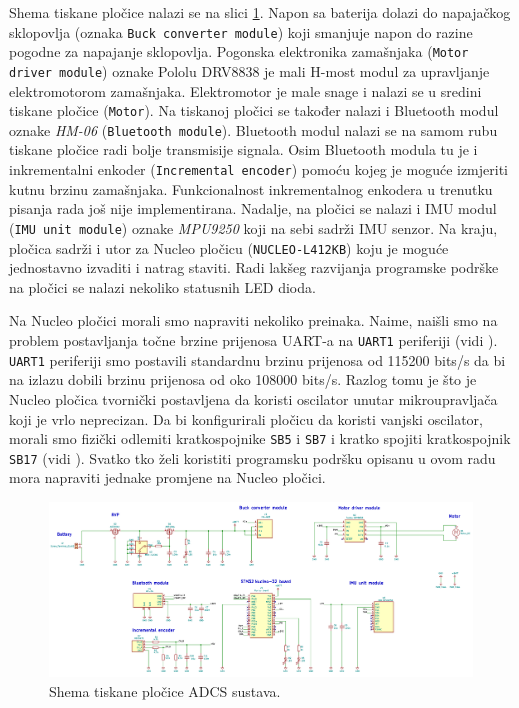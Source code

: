 \documentclass[times, utf8, diplomski, numeric]{templates/template}
\begin{document}
{{{            Shema tiskane pločice nalazi se na slici \ref{fig:plocica_shema}. Napon sa baterija dolazi do napajačkog sklopovlja (oznaka \texttt{Buck converter module}) koji smanjuje napon do razine pogodne za napajanje sklopovlja. Pogonska elektronika zamašnjaka (\texttt{Motor driver module}) oznake Pololu DRV8838 \cite{pololu} je mali H-most modul za upravljanje elektromotorom zamašnjaka. Elektromotor je male snage i nalazi se u sredini tiskane pločice (\texttt{Motor}). Na tiskanoj pločici se također nalazi i Bluetooth modul oznake \emph{HM-06} (\texttt{Bluetooth module}). Bluetooth modul nalazi se na samom rubu tiskane pločice radi bolje transmisije signala. Osim Bluetooth modula tu je i inkrementalni enkoder (\texttt{Incremental encoder}) pomoću kojeg je moguće izmjeriti kutnu brzinu zamašnjaka. Funkcionalnost inkrementalnog enkodera u trenutku pisanja rada još nije implementirana. Nadalje, na pločici se nalazi i IMU modul (\texttt{IMU unit module}) oznake \emph{MPU9250} koji na sebi sadrži IMU  senzor. Na kraju, pločica sadrži i utor za Nucleo pločicu (\texttt{NUCLEO-L412KB}) \cite{nucleo_um} koju je moguće jednostavno izvaditi i natrag staviti. Radi lakšeg razvijanja programske podrške na pločici se nalazi nekoliko statusnih LED dioda.

            Na Nucleo pločici morali smo napraviti nekoliko preinaka. Naime, naišli smo na problem postavljanja točne brzine prijenosa UART-a  na \texttt{UART1} periferiji (vidi \cite{uc_um}). \texttt{UART1} periferiji smo postavili standardnu brzinu prijenosa od 115200 bits/s da bi na izlazu dobili brzinu prijenosa od oko 108000 bits/s. Razlog tomu je što je Nucleo pločica tvornički postavljena da koristi oscilator unutar mikroupravljača koji je vrlo neprecizan. Da bi konfigurirali pločicu da koristi vanjski oscilator, morali smo fizički odlemiti kratkospojnike \texttt{SB5} i \texttt{SB7} i kratko spojiti kratkospojnik \texttt{SB17} (vidi \cite{nucleo_um}). Svatko tko želi koristiti programsku podršku opisanu u ovom radu mora napraviti jednake promjene na Nucleo pločici.

            \begin{figure}[htb]
            \centering
            \includegraphics[width=1.0\textwidth]{images/plocica_shema.png}
            \caption{Shema tiskane pločice ADCS sustava.}
            \label{fig:plocica_shema}
            \end{figure}
        }

}}
\end{document}
